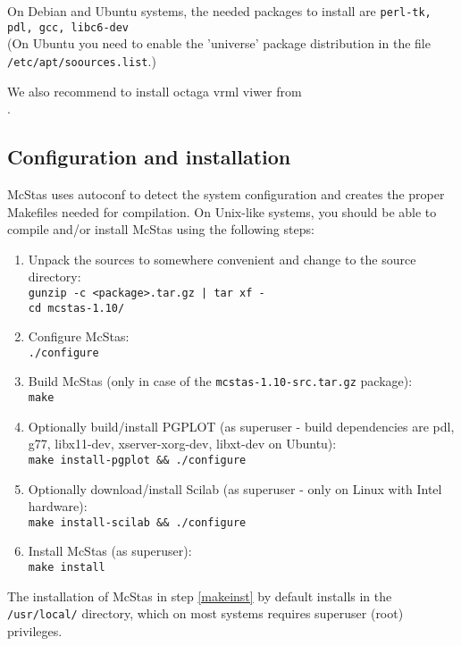 \noindent On Debian and Ubuntu systems, the
needed packages to install are \texttt{perl-tk, pdl, gcc,
  libc6-dev} \\(On Ubuntu you need to enable the 'universe' package
distribution in the file \\\verb+/etc/apt/soources.list+.) 

\noindent We also recommend to install octaga vrml viwer from
\\.

\subsection{Configuration and installation}
McStas uses autoconf to detect the system configuration and creates the
proper Makefiles needed for compilation. On Unix-like systems, you
should be able to compile and/or install McStas using the following steps:
\begin{enumerate}
\item{Unpack the sources to somewhere convenient and change to the
    source directory:\\
  \texttt{gunzip -c <package>.tar.gz | tar xf -}\\
  \texttt{cd mcstas-1.10/}}
\item{Configure McStas:\\
  \texttt{./configure}}
\item{Build McStas (only in case of the \verb+mcstas-1.10-src.tar.gz+ package):\\
  \texttt{make}}
\item{Optionally build/install PGPLOT (as superuser - build 
    dependencies are pdl, g77, libx11-dev, xserver-xorg-dev, libxt-dev
    on Ubuntu):\\
    \texttt{make install-pgplot \&\& ./configure}
    \label{pg_install}}
\item{Optionally download/install Scilab (as superuser - only on Linux
    with Intel hardware):\\
    \texttt{make install-scilab \&\& ./configure}
    \label{sci_install}}
\item{Install McStas (as superuser):\\
  \texttt{make install}
\label{makeinst}}
\end{enumerate}



\noindent The installation of McStas in step \ref{makeinst} by default installs in the
\texttt{/usr/local/} directory, which on most systems requires superuser (root)
privileges. 

